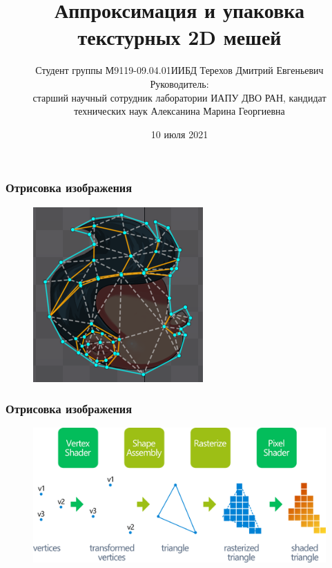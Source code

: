 \documentclass[10pt, unicode]{beamer}
\title{Аппроксимация и упаковка текстурных 2D мешей}
\author[Терехов Д.Е.]{Студент группы М9119-09.04.01ИИБД Терехов Дмитрий Евгеньевич\\
Руководитель:\\
старший научный сотрудник лаборатории ИАПУ ДВО РАН, кандидат технических наук Алексанина Марина Георгиевна}
\date{10 июля 2021}
\begin{document}
    \begin{frame}[fragile]
        \titlepage
        \thispagestyle{empty}
    \end{frame}
    \begin{frame}
        \frametitle{Отрисовка изображения}
        \begin{figure}[H]
            \centering
            \includegraphics[scale=0.6]{spine_mesh.png}
        \end{figure}
    \end{frame}
    \begin{frame}
        \frametitle{Отрисовка изображения}
        \begin{figure}[H]
            \centering
            \includegraphics[scale=0.5]{graphicspipeline.png}
        \end{figure}
    \end{frame}
\end{document}
